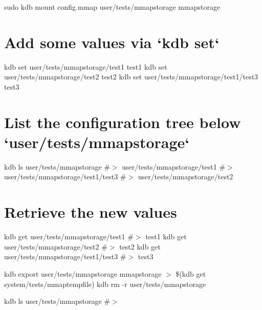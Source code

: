 sudo kdb mount config.\+mmap user/tests/mmapstorage mmapstorage\hypertarget{autotoc_md444_autotoc_md458}{}\section{Add some values via `kdb set`}\label{autotoc_md444_autotoc_md458}
kdb set user/tests/mmapstorage/test1 test1 kdb set user/tests/mmapstorage/test2 test2 kdb set user/tests/mmapstorage/test1/test3 test3\hypertarget{autotoc_md444_autotoc_md459}{}\section{List the configuration tree below `user/tests/mmapstorage`}\label{autotoc_md444_autotoc_md459}
kdb ls user/tests/mmapstorage \#$>$ user/tests/mmapstorage/test1 \#$>$ user/tests/mmapstorage/test1/test3 \#$>$ user/tests/mmapstorage/test2\hypertarget{autotoc_md444_autotoc_md460}{}\section{Retrieve the new values}\label{autotoc_md444_autotoc_md460}
kdb get user/tests/mmapstorage/test1 \#$>$ test1 kdb get user/tests/mmapstorage/test2 \#$>$ test2 kdb get user/tests/mmapstorage/test1/test3 \#$>$ test3

kdb export user/tests/mmapstorage mmapstorage $>$ \$(kdb get system/tests/mmaptempfile) kdb rm -\/r user/tests/mmapstorage

kdb ls user/tests/mmapstorage \#$>$

